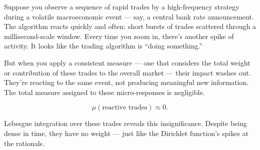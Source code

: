 \vspace{0.5em}
\noindent
Suppose you observe a sequence of rapid trades by a high-frequency strategy during a volatile macroeconomic event — say, a central bank rate announcement. The algorithm reacts quickly and often: short bursts of trades scattered through a millisecond-scale window. Every time you zoom in, there’s another spike of activity. It looks like the trading algorithm is “doing something.”

But when you apply a consistent measure — one that considers the total weight or contribution of these trades to the overall market — their impact washes out. They're reacting to the same event, not producing meaningful new information. The total measure assigned to these micro-responses is negligible.

\[
\mu(\text{reactive trades}) \approx 0.
\]

Lebesgue integration over these trades reveals this insignificance. Despite being dense in time, they have no weight — just like the Dirichlet function's spikes at the rationals.

